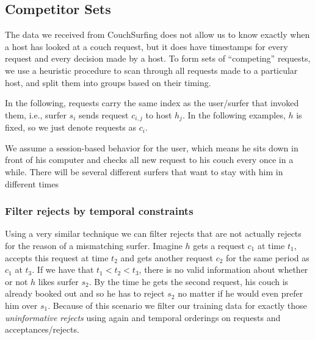 \subsection{Competitor Sets} \label{subsec:competitor_sets}

The data we received from CouchSurfing does not allow us to know exactly when a host has looked at a couch request, but it does have timestamps for every request and every decision made by a host.
To form sets of ``competing'' requests, we use a heuristic procedure to scan through all requests made to a particular host, and split them into groups based on their timing.

In the following, requests carry the same index as the user/surfer that invoked them, i.e., surfer $s_i$ sends request $c_{i,j}$ to host $h_j$.
In the following examples, $h$ is fixed, so we just denote requests as $c_i$.

We assume a session-based behavior for the user, which means he sits down in front of his computer and checks all new request to his couch every once in a while. There will be several different surfers that want to stay with him in different times
 


\subsubsection{Filter rejects by temporal constraints}


Using a very similar technique we can filter rejects that are not actually rejects for the reason of a mismatching surfer. Imagine $h$ gets a request $c_1$ at time $t_1$, accepts this request at time $t_2$ and gets another request $c_2$ for the same period as $c_1$ at $t_3$. If we have that $t_1 < t_2 < t_3$, there is no valid information about whether or not $h$ likes surfer $s_2$. By the time he gets the second request, his couch is already booked out and so he has to reject $s_2$ no matter if he would even prefer him over $s_1$. Because of this scenario we filter our training data for exactly those \textit{uninformative rejects} using again and temporal orderings on requests and acceptances/rejects.

